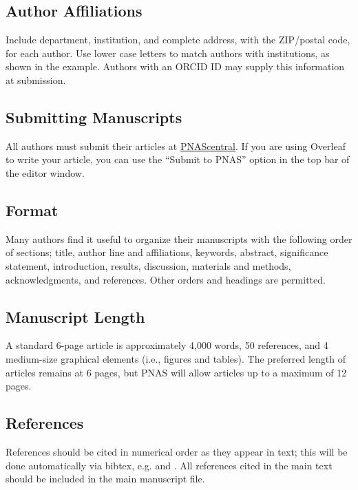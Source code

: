 \documentclass[9pt,twocolumn,twoside,lineno]{pnas-new}
\begin{document}
\subsection*{Author Affiliations}

Include department, institution, and complete address, with the ZIP/postal code, for each author. Use lower case letters to match authors with institutions, as shown in the example. Authors with an ORCID ID may supply this information at submission.

\subsection*{Submitting Manuscripts}

All authors must submit their articles at \href{http://www.pnascentral.org/cgi-bin/main.plex}{PNAScentral}. If you are using Overleaf to write your article, you can use the ``Submit to PNAS'' option in the top bar of the editor window. 

\subsection*{Format}

Many authors find it useful to organize their manuscripts with the following order of sections;  title, author line and affiliations, keywords, abstract, significance statement, introduction, results, discussion, materials and methods, acknowledgments, and references. Other orders and headings are permitted.

\subsection*{Manuscript Length}

A standard 6-page article is approximately 4,000 words, 50 references, and 4 medium-size graphical elements (i.e., figures and tables). The preferred length of articles remains at 6 pages, but PNAS will allow articles up to a maximum of 12 pages.

\subsection*{References}

References should be cited in numerical order as they appear in text; this will be done automatically via bibtex, e.g. \cite{belkin2002using} and \cite{berard1994embedding,coifman2005geometric}. All references cited in the main text should be included in the main manuscript file.
\end{document}
